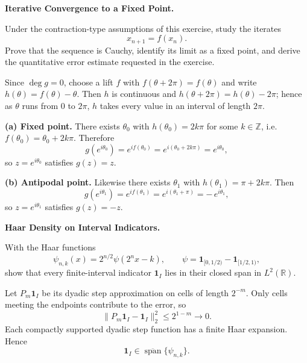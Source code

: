 \begin{problem}[CP-II-0267]
\label{prob:cp-ii-0267}
\textbf{Iterative Convergence to a Fixed Point.}

\hspace*{1.5em}Under the contraction-type assumptions of this exercise, study the iterates
\[
x_{n+1}=f(x_n).
\]
Prove that the sequence is Cauchy, identify its limit as a fixed point, and
derive the quantitative error estimate requested in the exercise.
\end{problem}

\begin{solution}
Since $\deg g=0$, choose a lift $f$ with $f(\theta+2\pi)=f(\theta)$ and write $h(\theta)=f(\theta)-\theta$.
Then $h$ is continuous and $h(\theta+2\pi)=h(\theta)-2\pi$; hence as $\theta$ runs from $0$ to $2\pi$,
$h$ takes every value in an interval of length $2\pi$.

\smallskip
\noindent\textbf{(a) Fixed point.}
There exists $\theta_0$ with $h(\theta_0)=2k\pi$ for some $k\in\mathbb Z$, i.e.
$f(\theta_0)=\theta_0+2k\pi$. Therefore
\[
g(e^{i\theta_0})=e^{if(\theta_0)}=e^{i(\theta_0+2k\pi)}=e^{i\theta_0},
\]
so $z=e^{i\theta_0}$ satisfies $g(z)=z$.

\smallskip
\noindent\textbf{(b) Antipodal point.}
Likewise there exists $\theta_1$ with $h(\theta_1)=\pi+2k\pi$.
Then
\[
g(e^{i\theta_1})=e^{if(\theta_1)}=e^{i(\theta_1+\pi)}=-\,e^{i\theta_1},
\]
so $z=e^{i\theta_1}$ satisfies $g(z)=-z$.

\bigskip
\end{solution}

\begin{problem}[CP-II-0270]
\label{prob:cp-ii-0270}
\textbf{Haar Density on Interval Indicators.}

\hspace*{1.5em}With the Haar functions
\[
\psi_{n,k}(x)=2^{n/2}\psi(2^nx-k),\qquad
\psi=\mathbf1_{[0,1/2)}-\mathbf1_{[1/2,1)},
\]
show that every finite-interval indicator \(\mathbf1_I\) lies in their closed span in \(L^2(\mathbb R)\).
\end{problem}

\begin{solution}
Let \(P_m\mathbf1_I\) be its dyadic step approximation on cells of length \(2^{-m}\). Only cells meeting the endpoints contribute to the error, so
\[
\|P_m\mathbf1_I-\mathbf1_I\|_2^2\le2^{1-m}\to0.
\]
Each compactly supported dyadic step function has a finite Haar expansion. Hence
\[
\boxed{\mathbf1_I\in\overline{\operatorname{span}}\{\psi_{n,k}\}.}
\]
\end{solution}


